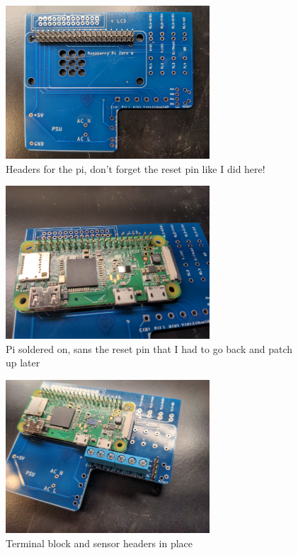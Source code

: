\begin{figure}
  \centering
  \includegraphics[width=3in]{img/pi_header_placement_soldered_on.jpg}
  \caption{Headers for the pi, don't forget the reset pin like I did here!}
  \label{fig:pi_headers}
\end{figure}
\begin{figure}
  \centering
  \includegraphics[width=3in]{img/pi_soldered_on.jpg}
  \caption{Pi soldered on, sans the reset pin that I had to go back and patch
	up later}
  \label{fig:pi}
\end{figure}
\begin{figure}
  \centering
  \includegraphics[width=3in]{img/terminal_block_placement.jpg}
  \caption{Terminal block and sensor headers in place}
  \label{fig:terminal_block_in_place}
\end{figure}
